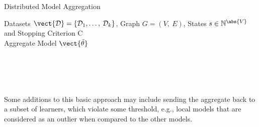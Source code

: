 \begin{algo}{Distributed Model Aggregation}
    \begin{algorithm}[H]
    \caption[Distributed Learning with PGMs]{General approach to distributed learning. While the stopping criterion $C$ has not been fulfilled, the distributed learners update the observed data in each round and train a new or updated model. Afterward, the local parameters are sent to the coordinator and aggregated with some aggregation algorithm.}
        \begin{algorithmic}[1]
            \label{alg:magg}
            \REQUIRE Datasets $\mathcal{\vect{D}} = \{\mathcal{D}_1, \ldots,\: \mathcal{D}_k\}$, Graph $G=(V,\:E)$, States $s \in \mathbb{N}^{\abs{V}}$ and Stopping Criterion C \\
            \ENSURE Aggregate Model $\vect{\tilde{\theta}}$  \\
             \\
             \\
            \\
                 \\
            \ENDIF
            \ENDWHILE
            \RETURN {$\vect{\tilde{\theta}}$}
        \end{algorithmic}
    \end{algorithm}
\end{algo}
Some additions to this basic approach may include sending the aggregate back to a subset of learners, which violate some threshold, e.g., local models that are considered as an outlier when compared to the other models.

